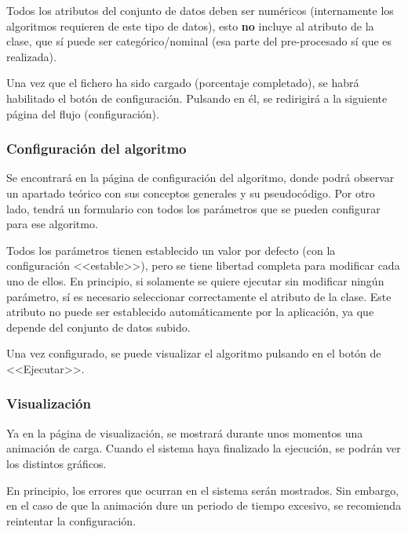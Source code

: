 \begin{tcolorbox}[colback=red!5!white,colframe=red!75!black,fontupper=\footnotesize,title=Requisito fundamental]
Todos los atributos del conjunto de datos deben ser numéricos (internamente los
algoritmos requieren de este tipo de datos), esto \textbf{no} incluye al
atributo de la clase, que sí puede ser categórico/nominal (esa parte del
pre-procesado sí que es realizada).
\end{tcolorbox}

Una vez que el fichero ha sido cargado (porcentaje completado), se habrá
habilitado el botón de configuración. Pulsando en él, se redirigirá a la
siguiente página del flujo (configuración).

\subsubsection{Configuración del algoritmo}
\label{mu:configuracion}
Se encontrará en la página de configuración del algoritmo, donde podrá observar
un apartado teórico con sus conceptos generales y su pseudocódigo. Por otro
lado, tendrá un formulario con todos los parámetros que se pueden configurar
para ese algoritmo.


Todos los parámetros tienen establecido un valor por defecto (con la
configuración <<estable>>), pero se tiene libertad completa para modificar cada
uno de ellos. En principio, si solamente se quiere ejecutar sin modificar ningún
parámetro, sí es necesario seleccionar correctamente el atributo de la clase.
Este atributo no puede ser establecido automáticamente por la aplicación, ya que
depende del conjunto de datos subido. 

Una vez configurado, se puede visualizar el algoritmo pulsando en el botón de
<<Ejecutar>>.

\subsubsection{Visualización}
\label{mu:visualizacion}
Ya en la página de visualización, se mostrará durante unos momentos una
animación de carga. Cuando el sistema haya finalizado la ejecución, se podrán
ver los distintos gráficos.

En principio, los errores que ocurran en el sistema serán mostrados. Sin
embargo, en el caso de que la animación dure un periodo de tiempo excesivo, se
recomienda reintentar la configuración.

